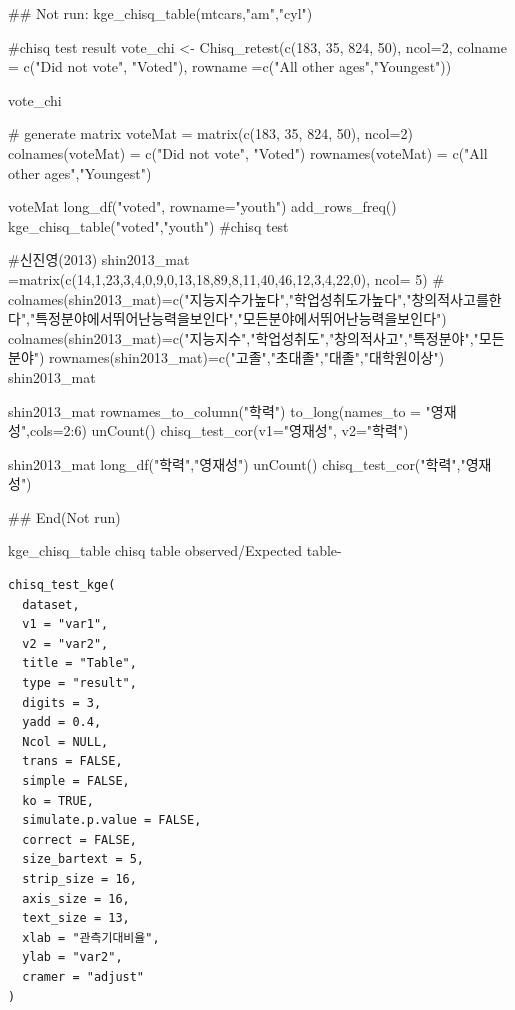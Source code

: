 \documentclass[a4paper]{book}
\begin{document}
\begin{Examples}
\begin{ExampleCode}

\#\# Not run: 
kge_chisq_table(mtcars,"am","cyl")


#chisq test result
vote_chi <- Chisq_retest(c(183, 35, 824, 50), ncol=2,
                        colname = c("Did not vote", "Voted"),
                         rowname =c("All other ages","Youngest"))

vote_chi


# generate matrix
voteMat = matrix(c(183, 35, 824, 50), ncol=2)
colnames(voteMat) = c("Did not vote", "Voted")
rownames(voteMat) = c("All other ages","Youngest")

voteMat%
  long_df("voted", rowname="youth")%
  add_rows_freq() %
  kge_chisq_table("voted","youth")    #chisq test


#신진영(2013)
shin2013_mat =matrix(c(14,1,23,3,4,0,9,0,13,18,89,8,11,40,46,12,3,4,22,0), ncol= 5)
# colnames(shin2013_mat)=c("지능지수가높다","학업성취도가높다","창의적사고를한다","특정분야에서뛰어난능력을보인다","모든분야에서뛰어난능력을보인다")
colnames(shin2013_mat)=c("지능지수","학업성취도","창의적사고","특정분야","모든분야")
rownames(shin2013_mat)=c("고졸","초대졸","대졸","대학원이상")
shin2013_mat

shin2013_mat %
  rownames_to_column("학력") %
  to_long(names_to = "영재성",cols=2:6) %
  unCount() %
  chisq_test_cor(v1="영재성", v2="학력")


shin2013_mat%
  long_df("학력","영재성") %
  unCount() %
  chisq_test_cor("학력","영재성")


## End(Not run)
\end{ExampleCode}
\end{Examples}
%
\begin{Description}
kge\_chisq\_table chisq table observed/Expected table-
\end{Description}
%
\begin{Usage}
\begin{verbatim}
chisq_test_kge(
  dataset,
  v1 = "var1",
  v2 = "var2",
  title = "Table",
  type = "result",
  digits = 3,
  yadd = 0.4,
  Ncol = NULL,
  trans = FALSE,
  simple = FALSE,
  ko = TRUE,
  simulate.p.value = FALSE,
  correct = FALSE,
  size_bartext = 5,
  strip_size = 16,
  axis_size = 16,
  text_size = 13,
  xlab = "관측기대비율",
  ylab = "var2",
  cramer = "adjust"
)
\end{verbatim}
\end{Usage}
\end{document}
